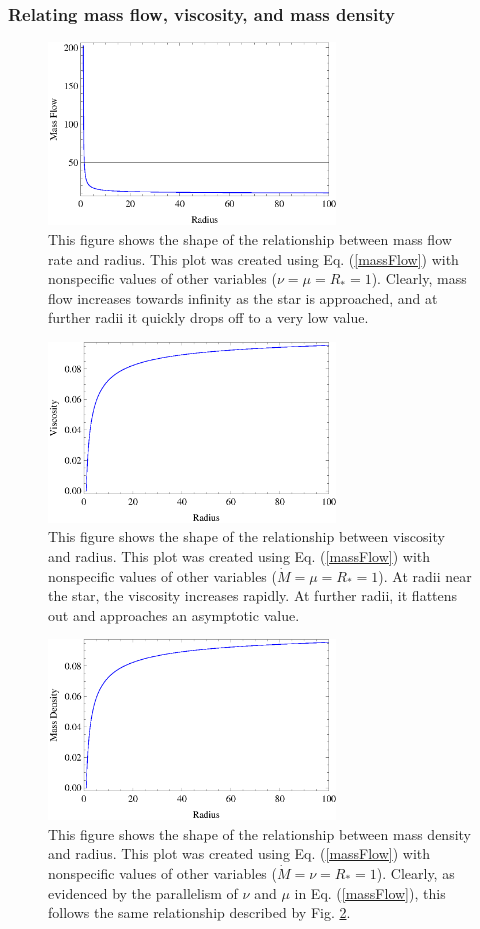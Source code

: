 \documentclass[aps,pra,twocolumn]{revtex4-1}
\begin{document}
\subsubsection{\label{section 2.2.1} Relating mass flow, viscosity, and mass density}
\begin{figure} [b!]
	\includegraphics[width=3in]{massFlow.eps}
	\caption{This figure shows the shape of the relationship between mass flow rate and radius.  This plot was created using Eq. (\ref{massFlow}) with nonspecific values of other variables ($\nu = \mu = R_* = 1$).  Clearly, mass flow increases towards infinity as the star is approached, and at further radii it quickly drops off to a very low value. \label{massFlowFig}}
\end{figure}
\begin{figure} [t!]
	\includegraphics[width=3in]{viscosity.eps}
	\caption{This figure shows the shape of the relationship between viscosity and radius.  This plot was created using Eq. (\ref{massFlow}) with nonspecific values of other variables ($\dot{M} = \mu = R_* = 1$).  At radii near the star, the viscosity increases rapidly.  At further radii, it flattens out and approaches an asymptotic value. \label{viscosityFig}}
\end{figure}
\begin{figure} [b!]
	\includegraphics[width=3in]{massDensity.eps}
	\caption{This figure shows the shape of the relationship between mass density and radius.  This plot was created using Eq. (\ref{massFlow}) with nonspecific values of other variables ($\dot{M} = \nu = R_* = 1$).  Clearly, as evidenced by the parallelism of $\nu$ and $\mu$ in Eq. (\ref{massFlow}), this follows the same relationship described by Fig. \ref{viscosityFig}.  \label{massDensityFig}}
\end{figure}
\end{document}
